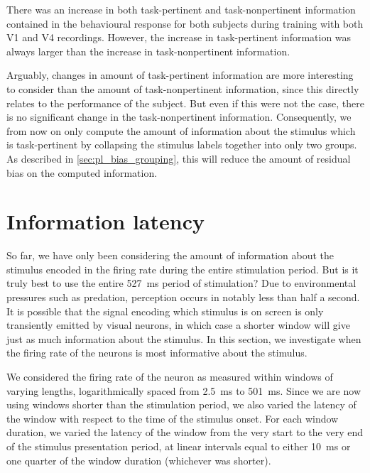 There was an increase in both task-pertinent and task-nonpertinent information contained in the behavioural response for both subjects during training with both \ac{V1} and \ac{V4} recordings.
However, the increase in task-pertinent information was always larger than the increase in task-nonpertinent information.

Arguably, changes in amount of task-pertinent information are more interesting to consider than the amount of task-nonpertinent information, since this directly relates to the performance of the subject.
But even if this were not the case, there is no significant change in the task-nonpertinent information.
Consequently, we from now on only compute the amount of information about the stimulus which is task-pertinent by collapsing the stimulus labels together into only two groups.
As described in \autoref{sec:pl_bias_grouping}, this will reduce the amount of residual bias on the computed information.


\section{Information latency}
\label{sec:pl_info_latency}

So far, we have only been considering the amount of information about the stimulus encoded in the firing rate during the entire stimulation period.
But is it truly best to use the entire \SI{527}{\milli\second} period of stimulation?
Due to environmental pressures such as predation, perception occurs in notably less than half a second.
It is possible that the signal encoding which stimulus is on screen is only transiently emitted by visual neurons, in which case a shorter window will give just as much information about the stimulus.
In this section, we investigate when the firing rate of the neurons is most informative about the stimulus.

We considered the firing rate of the neuron as measured within windows of varying lengths, logarithmically spaced from \SI{2.5}{\milli\second} to \SI{501}{\milli\second}.
Since we are now using windows shorter than the stimulation period, we also varied the latency of the window with respect to the time of the stimulus onset.
For each window duration, we varied the latency of the window from the very start to the very end of the stimulus presentation period, at linear intervals equal to either \SI{10}{\milli\second} or one quarter of the window duration (whichever was shorter).

